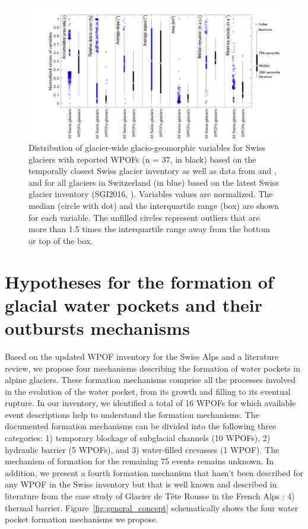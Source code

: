 \begin{figure}
    \centering
    \includegraphics[width=1\linewidth]{chapters/chapter_WPOFs/geomorpho_variables.pdf}
    \caption{Distribution of glacier-wide glacio-geomorphic variables for Swiss glaciers with reported WPOFs (n = 37, in black) based on the temporally closest  Swiss glacier inventory \citep{Muller&al1976, Maisch&al2000, Linsbauer&al2021} as well as data from \cite{Altrock2022} and \cite{Millan&al2022}, and for all glaciers in Switzerland (in blue) based on the latest Swiss glacier inventory (SGI2016, \citet{Linsbauer&al2021}). Variables values are normalized. The median (circle with dot) and the interquartile range (box) are shown for each variable. The unfilled circles represent outliers that are more than 1.5 times the interquartile range away from the bottom or top of the box.}
    \label{fig:distribution_geo}
\end{figure}




\section{ Hypotheses for the formation of glacial water pockets and their outbursts mechanisms}
\label{sec:mechanisms}

Based on the updated WPOF inventory for the Swiss Alps and a literature review, we propose four mechanisms describing the formation of water pockets in alpine glaciers. These formation mechanisms comprise all the processes involved in the evolution of the water pocket, from its growth and filling to its eventual rupture. In our inventory, we identified a total of 16 WPOFs for which available event descriptions help to understand the formation mechanisms. The documented formation mechanisms can be divided into the following three categories: 1) temporary blockage of subglacial channels (10 WPOFs), 2) hydraulic barrier (5 WPOFs), and 3) water-filled crevasses (1 WPOF). The mechanism of formation for the remaining 75 events remains unknown. In addition, we present a fourth formation mechanism that hasn't been described for any WPOF in the Swiss inventory but that is well known and described in literature from the case study of Glacier de Tête Rousse in the French Alps \citep{Vincent&al2010b}: 4) thermal barrier. Figure~\ref{fig:general_concept} schematically shows the four water pocket formation mechanisms we propose. 




